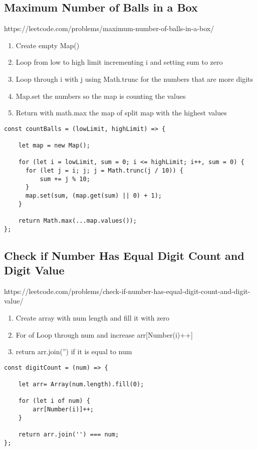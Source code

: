 \documentclass[10pt]{article}
\begin{document}
\pagebreak %
\medskip   
\subsection{Maximum Number of Balls in a Box}
https://leetcode.com/problems/maximum-number-of-balls-in-a-box/

\begin{enumerate}
	\item Create empty Map()
	\item Loop from low to high limit incrementing i and setting sum to zero
	\item Loop through i with j using Math.trunc for the numbers that are more digits
	\item Map.set the numbers so the map is counting the values
	\item Return with math.max the map of split map with the highest values
\end{enumerate}

\begin{lstlisting}[title=Solution countBalls, captionpos=t]
const countBalls = (lowLimit, highLimit) => {
     
    let map = new Map();
       
    for (let i = lowLimit, sum = 0; i <= highLimit; i++, sum = 0) {
      for (let j = i; j; j = Math.trunc(j / 10)) {
          sum += j % 10;
      }
      map.set(sum, (map.get(sum) || 0) + 1);
    }
  
    return Math.max(...map.values());
};
\end{lstlisting}
\medskip %




\pagebreak %
\medskip   
\subsection{Check if Number Has Equal Digit Count and Digit Value}
https://leetcode.com/problems/check-if-number-has-equal-digit-count-and-digit-value/

\begin{enumerate}
	\item Create array with num length and fill it with zero 
	\item For of Loop through num and increase arr[Number(i)++]
	\item return arr.join('') if it is equal to num 
\end{enumerate}

\begin{lstlisting}[title=Solution digitCount, captionpos=t]
const digitCount = (num) => {
    
    let arr= Array(num.length).fill(0);

    for (let i of num) {
        arr[Number(i)]++;
    }
    
    return arr.join('') === num;
};
\end{lstlisting}
\medskip %
\end{document}
